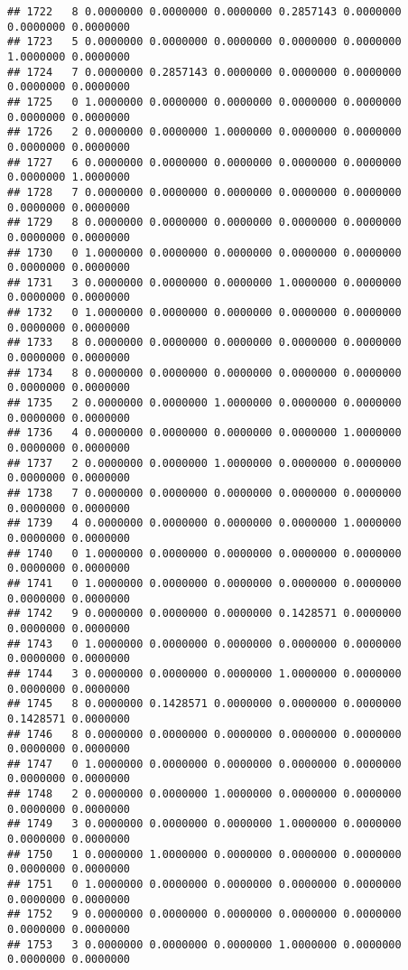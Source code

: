 \documentclass[
]{article}
\begin{document}
\begin{verbatim}
## 1722   8 0.0000000 0.0000000 0.0000000 0.2857143 0.0000000 0.0000000 0.0000000
## 1723   5 0.0000000 0.0000000 0.0000000 0.0000000 0.0000000 1.0000000 0.0000000
## 1724   7 0.0000000 0.2857143 0.0000000 0.0000000 0.0000000 0.0000000 0.0000000
## 1725   0 1.0000000 0.0000000 0.0000000 0.0000000 0.0000000 0.0000000 0.0000000
## 1726   2 0.0000000 0.0000000 1.0000000 0.0000000 0.0000000 0.0000000 0.0000000
## 1727   6 0.0000000 0.0000000 0.0000000 0.0000000 0.0000000 0.0000000 1.0000000
## 1728   7 0.0000000 0.0000000 0.0000000 0.0000000 0.0000000 0.0000000 0.0000000
## 1729   8 0.0000000 0.0000000 0.0000000 0.0000000 0.0000000 0.0000000 0.0000000
## 1730   0 1.0000000 0.0000000 0.0000000 0.0000000 0.0000000 0.0000000 0.0000000
## 1731   3 0.0000000 0.0000000 0.0000000 1.0000000 0.0000000 0.0000000 0.0000000
## 1732   0 1.0000000 0.0000000 0.0000000 0.0000000 0.0000000 0.0000000 0.0000000
## 1733   8 0.0000000 0.0000000 0.0000000 0.0000000 0.0000000 0.0000000 0.0000000
## 1734   8 0.0000000 0.0000000 0.0000000 0.0000000 0.0000000 0.0000000 0.0000000
## 1735   2 0.0000000 0.0000000 1.0000000 0.0000000 0.0000000 0.0000000 0.0000000
## 1736   4 0.0000000 0.0000000 0.0000000 0.0000000 1.0000000 0.0000000 0.0000000
## 1737   2 0.0000000 0.0000000 1.0000000 0.0000000 0.0000000 0.0000000 0.0000000
## 1738   7 0.0000000 0.0000000 0.0000000 0.0000000 0.0000000 0.0000000 0.0000000
## 1739   4 0.0000000 0.0000000 0.0000000 0.0000000 1.0000000 0.0000000 0.0000000
## 1740   0 1.0000000 0.0000000 0.0000000 0.0000000 0.0000000 0.0000000 0.0000000
## 1741   0 1.0000000 0.0000000 0.0000000 0.0000000 0.0000000 0.0000000 0.0000000
## 1742   9 0.0000000 0.0000000 0.0000000 0.1428571 0.0000000 0.0000000 0.0000000
## 1743   0 1.0000000 0.0000000 0.0000000 0.0000000 0.0000000 0.0000000 0.0000000
## 1744   3 0.0000000 0.0000000 0.0000000 1.0000000 0.0000000 0.0000000 0.0000000
## 1745   8 0.0000000 0.1428571 0.0000000 0.0000000 0.0000000 0.1428571 0.0000000
## 1746   8 0.0000000 0.0000000 0.0000000 0.0000000 0.0000000 0.0000000 0.0000000
## 1747   0 1.0000000 0.0000000 0.0000000 0.0000000 0.0000000 0.0000000 0.0000000
## 1748   2 0.0000000 0.0000000 1.0000000 0.0000000 0.0000000 0.0000000 0.0000000
## 1749   3 0.0000000 0.0000000 0.0000000 1.0000000 0.0000000 0.0000000 0.0000000
## 1750   1 0.0000000 1.0000000 0.0000000 0.0000000 0.0000000 0.0000000 0.0000000
## 1751   0 1.0000000 0.0000000 0.0000000 0.0000000 0.0000000 0.0000000 0.0000000
## 1752   9 0.0000000 0.0000000 0.0000000 0.0000000 0.0000000 0.0000000 0.0000000
## 1753   3 0.0000000 0.0000000 0.0000000 1.0000000 0.0000000 0.0000000 0.0000000

\end{verbatim}
\end{document}
